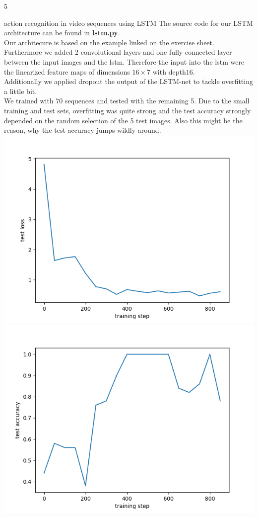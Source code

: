 \documentclass{article}
\begin{document}
    \begin{ukon-infie}[18.2.18]{5}

		
		\begin{exercise}[p=50+10]{action recognition in video sequences using LSTM}
		\question{}
		{
		The source code for our LSTM architecture can be found in \textbf{lstm.py}.\\
		Our architecure is based on the example linked on the exercise sheet. Furthermore we added 2 convolutional layers and one fully connected layer between the input images and the lstm. Therefore the input into the lstm were the linearized feature maps of dimensions $16 \times 7$ with depth$16$. \\
		Additionally we applied dropout the output of the LSTM-net to tackle overfitting a little bit.\\
		We trained with 70 sequences and tested with the remaining 5. Due to the small training and test sets, overfitting was quite strong and the test accuracy strongly depended on the random selection of the 5 test images. Also this might be the reason, why the test accuracy jumps wildly around.\\
		\includegraphics[scale=0.4]{lstm_test_loss.png}
		\includegraphics[scale=0.4]{lstm_test_accuracy.png}		
}
\end{exercise}
\end{ukon-infie}
\end{document}
